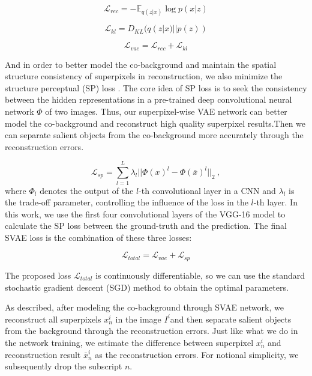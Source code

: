\documentclass[sigconf]{acmart}
\begin{document}
\begin{equation}
\mathcal{L}_{rec} = -\mathbb{E}_{q(z|x)}\log p(x|z)
\end{equation}

\begin{equation}
\mathcal{L}_{kl} = D_{KL}(q(z|x)||p(z))
\end{equation}

\begin{equation}
\mathcal{L}_{vae} = \mathcal{L}_{rec}+\mathcal{L}_{kl}
\end{equation}

And in order to better model the co-background and maintain the spatial structure consistency of superpixels in reconstruction, we also minimize the structure perceptual (SP) loss \cite{DBLP:conf/cvpr/GatysEB16}. The core idea of SP loss is to seek the consistency between the hidden representations in a pre-trained deep convolutional neural network $\Phi$ of two images.  Thus, our superpixel-wise VAE network can better model the co-background and reconstruct high quality superpixel results.Then we can separate salient objects from the co-background more accurately through the reconstruction errors.

\begin{equation}
\mathcal{L}_{sp} = \sum_{l=1}^{L}\lambda_{l}||\Phi(x)^{l}-\Phi(\bar{x})^{l}||_{2}~,
\end{equation}
where $\Phi_{l}$ denotes the output of the $l$-th convolutional layer in a CNN and $\lambda_{l}$ is the trade-off parameter, controlling the influence of the loss in the $l$-th layer. In this work, we use the first four convolutional layers of the VGG-16 model\cite{DBLP:journals/corr/SimonyanZ14a} to calculate the SP loss between the ground-truth and the prediction. The final SVAE loss is the combination of these three losses:

\begin{equation}
\mathcal{L}_{total} = \mathcal{L}_{vae}+\mathcal{L}_{sp} 
\end{equation}

The proposed loss $\mathcal{L}_{total}$ is continuously differentiable, so we can use the standard stochastic gradient descent (SGD) method to obtain the optimal parameters.


As described, after modeling the co-background  through SVAE network, we reconstruct all superpixels $x_{n}^{i}$ in the image $I^{i} $and then separate salient objects from the background through the reconstruction errors. Just like what we do in the network training, we estimate the difference between superpixel $x_{n}^{i}$ and reconstruction result $\bar{x}_{n}^{i}$ as the reconstruction errors. For notional simplicity, we subsequently drop the subscript $n$.
\end{document}
